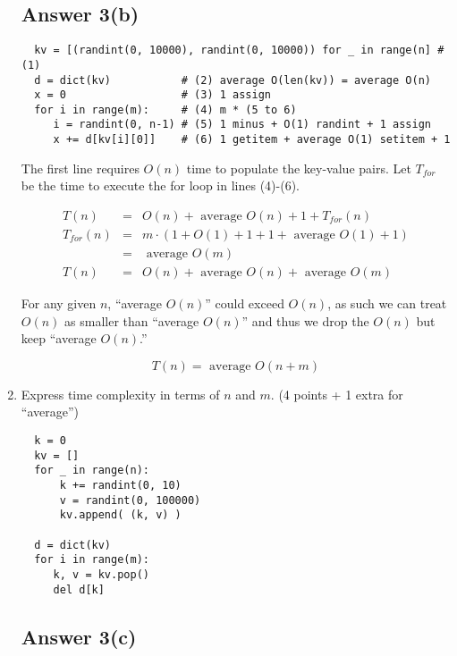 \documentclass{article}
\begin{document}
\begin{enumerate}[label=(\alph*)]
\subsection*{Answer 3(b)}

\begin{verbatim}
  kv = [(randint(0, 10000), randint(0, 10000)) for _ in range(n] # (1)
  d = dict(kv)           # (2) average O(len(kv)) = average O(n)
  x = 0                  # (3) 1 assign
  for i in range(m):     # (4) m * (5 to 6)
     i = randint(0, n-1) # (5) 1 minus + O(1) randint + 1 assign
     x += d[kv[i][0]]    # (6) 1 getitem + average O(1) setitem + 1
\end{verbatim}

The first line requires $O(n)$ time to populate the key-value pairs.
Let $T_{for}$ be the time to execute the for loop in lines (4)-(6).

\begin{eqnarray*}
  T(n) &=& O(n) + \text{ average } O(n) + 1 + T_{for}(n) \\
  T_{for}(n) &=& m \cdot (1 + O(1) + 1 + 1 + \text{ average } O(1) + 1) \\
  &=& \text{ average } O(m) \\
  T(n) &=& O(n) + \text{ average } O(n) + \text{ average } O(m)
\end{eqnarray*}

For any given $n$, ``average $O(n)$'' could exceed $O(n)$, as such
we can treat $O(n)$ as smaller than ``average $O(n)$'' and thus we
drop the $O(n)$ but keep ``average $O(n)$.''

\begin{equation*}
  \boxed{T(n) = \text{ average } O(n + m)}
\end{equation*}



\item Express time complexity in terms of $n$ and $m$. (4 points + 1 extra for ``average'')
  
\begin{verbatim}
  k = 0
  kv = []
  for _ in range(n):
      k += randint(0, 10)
      v = randint(0, 100000)
      kv.append( (k, v) )

  d = dict(kv)
  for i in range(m):
     k, v = kv.pop()
     del d[k]
\end{verbatim}

\subsection*{Answer 3(c)}


\end{enumerate}
\end{document}
